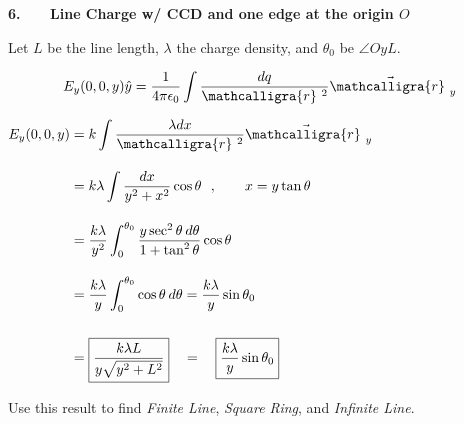 \documentclass[12pt]{article}
\newcommand{\scripty}[1]{\ensuremath{\mathcalligra{#1}}}
\newcommand*{\cursrr}{\scripty{r}\ }
\newcommand{\hs}{\hspace{1pt}}
\begin{document}
%
%
%
\newpage

\noindent
\begin{minipage}[t]{.48\textwidth}
	\textbf{6. \ \ \ Line Charge w/ CCD and one edge at the origin \(O\)}
	
	\vspace{10pt}	
	Let \(L\) be the line length, \(\lambda\) the charge density,
	and \(\theta_0\) be \(\angle OyL\).

	\vspace{5pt}
	\[ \displaystyle E_y(0,0,y) \hat{y} = \frac{1}{4 \pi \epsilon_0} \int \frac{dq}{\cursrr^2} \vec{\cursrr}_y\]

	\vspace{10pt}
	\(\begin{aligned}
		E_y(0,0,y) &= k \int \frac{\lambda dx}{\cursrr^2} \vec{\cursrr}_y\\[10pt]
		&= k \lambda \int \frac{ dx}{y^2 + x^2} \cos{\theta}
			\ \ , \hspace{20pt} x = y \tan{\theta}\\[10pt]
		&= \frac{k \lambda}{y^2} \int_0^{\theta_0} \frac{y \sec^2{\theta} \hs\hs d\theta}{1 + \tan^2{\theta}} \cos{\theta}\\[10pt]
		&= \frac{k \lambda}{y} \int_0^{\theta_0} \cos{\theta} \hs\hs d\theta = \frac{k \lambda}{y} \sin{\theta_0} \\[15pt]
		&= \boxed{ \frac{k \lambda L}{y \sqrt{y^2+L^2}} } \quad = \quad \boxed{ \frac{k \lambda}{y} \sin{\theta_0}}
	\end{aligned}\)

	\vspace{30pt}
	Use this result to find \textit{Finite Line}, \textit{Square Ring}, and \textit{Infinite Line}.
\end{minipage}
\hfill\vline\hfill
\end{document}

